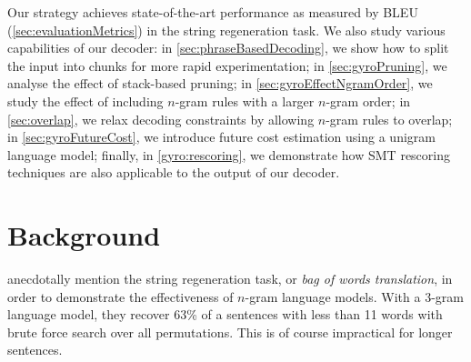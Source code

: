 Our strategy achieves state-of-the-art performance as
measured by BLEU (\autoref{sec:evaluationMetrics}) in the string regeneration
task. We also study various capabilities of our decoder: in
\autoref{sec:phraseBasedDecoding}, we show how to
split the input into chunks for more rapid experimentation;
in \autoref{sec:gyroPruning}, we analyse the effect of stack-based pruning;
in \autoref{sec:gyroEffectNgramOrder}, we study
the effect of including $n$-gram rules with a larger $n$-gram order;
in \autoref{sec:overlap}, we relax decoding constraints by allowing
$n$-gram rules to overlap; in \autoref{sec:gyroFutureCost}, we introduce
future cost estimation using a unigram language model; finally, in
\autoref{gyro:rescoring}, we demonstrate how SMT rescoring techniques
are also applicable to the output of our decoder.



\section{Background}
\label{sec:gyroBackground}


\citet{brown-cocke-dellapietra-dellapietra-jelinek-lafferty-mercer-roossin:1990:CL}
anecdotally mention the string regeneration task, or \emph{bag of words translation},
in order to demonstrate the effectiveness
of $n$-gram language models. With a 3-gram language model, they recover
63\% of a sentences with less than 11 words with brute force search
over all permutations. This is of course impractical for longer
sentences. %

